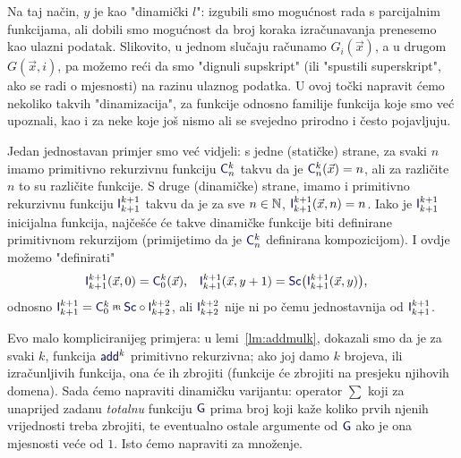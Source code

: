 Na taj način, $y$ je kao "dinamički $l$": izgubili smo mogućnost rada s parcijalnim funkcijama, ali dobili smo mogućnost da broj koraka izračunavanja prenesemo kao ulazni podatak. Slikovito, u jednom slučaju računamo $G_i(\vec x)$, a u drugom $G(\vec x,i)$, pa možemo reći da smo "dignuli supskript" (ili "spustili superskript", ako se radi o mjesnosti) na razinu ulaznog podatka. U ovoj točki napravit ćemo nekoliko takvih "dinamizacija", za funkcije odnosno familije funkcija koje smo već upoznali, kao i za neke koje još nismo ali se svejedno prirodno i često pojavljuju.

\begin{primjer}
Jedan jednostavan primjer smo već vidjeli: s jedne (statičke) strane, za svaki $n$ imamo primitivno rekurzivnu funkciju $\f C_n^k$ takvu da je $\f C_n^k(\vec x)=n$, ali za različite $n$ to su različite funkcije. S druge (dinamičke) strane, imamo i primitivno rekurzivnu funkciju $\f I_{k+1}^{k+1}$ takvu da je za sve $n\in{\mathbb N}$, $\f I_{k+1}^{k+1}(\vec x,n)=n$. Iako je $\f I_{k+1}^{k+1}$ inicijalna funkcija, najčešće će takve dinamičke funkcije biti definirane primitivnom rekurzijom (primijetimo da je $\f C_n^k$ definirana kompozicijom). I ovdje možemo "definirati"
\begin{align}
    \f I_{k+1}^{k+1}(\vec x,0)&=\f C_0^k(\vec x)\text,&
    \f I_{k+1}^{k+1}(\vec x,y+1)&=\f{Sc}\bigl(\f I_{k+1}^{k+1}(\vec x,y)\bigr)\text,
\end{align}
odnosno $\f I_{k+1}^{k+1}=\f C_0^k\pr\f{Sc}\circ\f I_{k+2}^{k+2}$, ali $\f I_{k+2}^{k+2}$ nije ni po čemu jednostavnija od $\f I_{k+1}^{k+1}$.
\end{primjer}



Evo malo kompliciranijeg primjera: u lemi~\ref{lm:addmulk}, dokazali smo da je za svaki $k$, funkcija $\f{add}^k$ primitivno rekurzivna; ako joj damo $k$ brojeva, ili izračunljivih funkcija, ona će ih zbrojiti (funkcije će zbrojiti na presjeku njihovih domena). Sada ćemo napraviti dinamičku varijantu: operator $\sum$ koji za unaprijed zadanu \emph{totalnu} funkciju $\f G$ prima broj koji kaže koliko prvih njenih vrijednosti treba zbrojiti, te eventualno ostale argumente od $\f G$ ako je ona mjesnosti veće od $1$. Isto ćemo napraviti za množenje.

